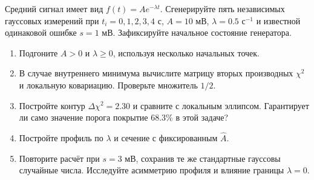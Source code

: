 \documentclass[
  russian,
  11pt,
  a4paper,
  open=any]{scrbook}
\providecommand{\tightlist}{%
  \setlength{\itemsep}{0pt}\setlength{\parskip}{0pt}}
\begin{document}
\begin{semanticpdfbox}[colback=BookCoralSoft,borderline west={1.2mm}{0pt}{BookCoral}]

\par\nopagebreak[4]\vspace{1.2mm}

Средний сигнал имеет вид \(f(t)=A e^{-\lambda t}\). Сгенерируйте пять
независимых гауссовых измерений при \(t_i=0,1,2,3,4\) с, \(A=10\) мВ,
\(\lambda=0.5\) с\(^{-1}\) и известной одинаковой ошибке \(s=1\) мВ.
Зафиксируйте начальное состояние генератора.

\begin{enumerate}
\def\labelenumi{\arabic{enumi}.}
\tightlist
\item
  Подгоните \(A>0\) и \(\lambda\ge0\), используя несколько начальных
  точек.
\item
  В случае внутреннего минимума вычислите матрицу вторых производных
  \(\chi^2\) и локальную ковариацию. Проверьте множитель \(1/2\).
\item
  Постройте контур \(\Delta\chi^2=2.30\) и сравните с локальным
  эллипсом. Гарантирует ли само значение порога покрытие \(68.3\%\) в
  этой задаче?
\item
  Постройте профиль по \(\lambda\) и сечение с фиксированным
  \(\widehat A\).
\item
  Повторите расчёт при \(s=3\) мВ, сохранив те же стандартные гауссовы
  случайные числа. Исследуйте асимметрию профиля и влияние границы
  \(\lambda=0\).
\end{enumerate}

\end{semanticpdfbox}
\end{document}
